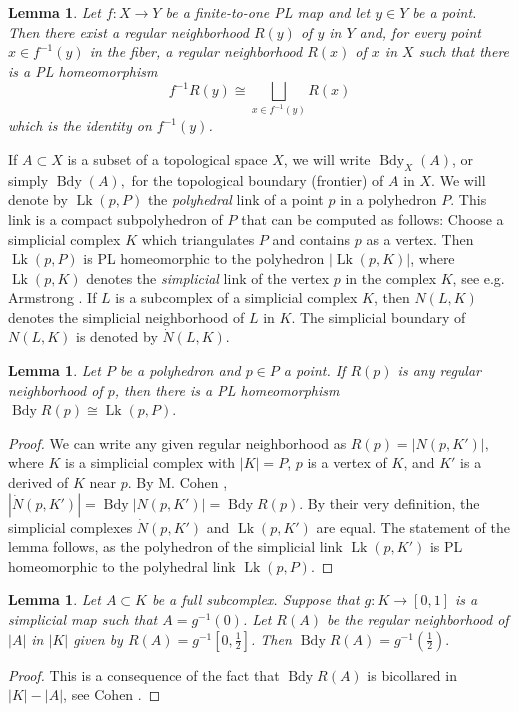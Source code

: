 \documentclass{amsart}
\newtheorem{lemma}[thm]{Lemma}
\theoremstyle{definition}
\theoremstyle{remark}
\newcommand {\smlhf} {\ensuremath{\mbox{$\frac{1}{2}$}}}
\newcommand {\Bdy}    {{\ensuremath{\operatorname{Bdy}}}}
\newcommand {\Lk}    {{\ensuremath{\operatorname{Lk}}}}
\begin{document}
\begin{lemma} \label{sublemma3}
Let $f: X\to Y$ be a finite-to-one PL map and let $y \in Y$ be a point.
Then there exist a regular neighborhood $R(y)$ of $y$ in $Y$ 
and, for every point $x\in f^{-1} (y)$ in the fiber, 
a regular neighborhood $R(x)$ of $x$ in $X$
such that there is a PL homeomorphism
\[ f^{-1} R(y) \cong \bigsqcup_{x\in f^{-1} (y)} R(x) \]
which is the identity on $f^{-1} (y)$.
\end{lemma}

If $A\subset X$ is a subset of a topological space $X$, we
will write $\Bdy_X (A)$, or simply $\Bdy (A),$ for the 
topological boundary (frontier) of $A$ in $X$.
We will denote by $\Lk (p,P)$ the \emph{polyhedral} link of
a point $p$ in a polyhedron $P$. This link is a compact subpolyhedron
of $P$ that can be computed as follows: Choose a simplicial complex $K$
which triangulates $P$ and contains $p$ as a vertex. Then 
$\Lk (p,P)$ is PL homeomorphic to the polyhedron $|\Lk (p,K)|$,
where $\Lk (p,K)$ denotes the \emph{simplicial} link of the vertex $p$
in the complex $K$, see e.g. Armstrong \cite[p. 177]{armstrong}.
If $L$ is a subcomplex of a simplicial complex $K$, then
$N(L,K)$ denotes the simplicial neighborhood of $L$ in $K$.
The simplicial boundary of $N(L,K)$ is denoted by $\dot{N} (L,K)$.
\begin{lemma} \label{sublemma4}
Let $P$ be a polyhedron and $p\in P$ a point.
If $R(p)$ is any regular neighborhood of $p$, then there is a 
PL homeomorphism
$\Bdy R(p) \cong \Lk (p,P).$
\end{lemma}
\begin{proof}
We can write any given regular neighborhood as
$R(p) = |N(p,K')|,$ where
$K$ is a simplicial complex with $|K|=P$, $p$ is a vertex of $K$,
and $K'$ is a derived of $K$ near $p$.
By M. Cohen \cite[p. 194, Lemma 2.12]{cohenmarshallgenregnbhds},
$|\dot{N} (p,K')| = \Bdy |N(p,K')| = \Bdy R(p)$.
By their very definition, the simplicial complexes $\dot{N} (p,K')$
and $\Lk (p,K')$ are equal. The statement of the lemma follows,
as the polyhedron of the simplicial link $\Lk (p,K')$ is PL homeomorphic
to the polyhedral link $\Lk (p,P)$.
\end{proof}

\begin{lemma} \label{sublemma5}
Let $A \subset K$ be a full subcomplex.
Suppose that $g: K \to [0,1]$ is a simplicial map such that
$A = g^{-1} (0)$. Let $R(A)$ be the regular neighborhood of $|A|$
in $|K|$ given by $R(A) = g^{-1} [0,\smlhf]$. Then
$\Bdy R(A) = g^{-1} (\smlhf).$
\end{lemma}
\begin{proof}
This is a consequence of the fact that $\Bdy R(A)$ is bicollared
in $|K| - |A|$, see Cohen \cite[p. 203, Thm. 5.3]{cohenmarshallgenregnbhds}.
\end{proof}
\end{document}
